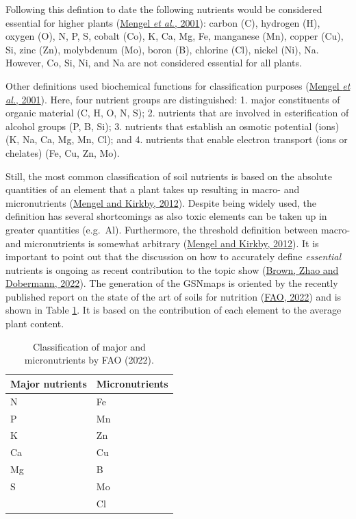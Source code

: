 \documentclass[
  10pt,
  b5paper,
  oneside]{book}
\begin{document}
Following this defintion to date the following nutrients would be considered essential for higher plants (\protect\hyperlink{ref-mengel2001}{Mengel \emph{et al.}, 2001}): carbon (C), hydrogen (H), oxygen (O), N, P, S, cobalt (Co), K, Ca, Mg, Fe, manganese (Mn), copper (Cu), Si, zinc (Zn), molybdenum (Mo), boron (B), chlorine (Cl), nickel (Ni), Na. However, Co, Si, Ni, and Na are not considered essential for all plants.

Other definitions used biochemical functions for classification purposes (\protect\hyperlink{ref-mengel2001}{Mengel \emph{et al.}, 2001}). Here, four nutrient groups are distinguished:
1. major constituents of organic material (C, H, O, N, S);
2. nutrients that are involved in esterification of alcohol groups (P, B, Si);
3. nutrients that establish an osmotic potential (ions) (K, Na, Ca, Mg, Mn, Cl); and
4. nutrients that enable electron transport (ions or chelates) (Fe, Cu, Zn, Mo).

Still, the most common classification of soil nutrients is based on the absolute quantities of an element that a plant takes up resulting in macro- and micronutrients (\protect\hyperlink{ref-mengel2012}{Mengel and Kirkby, 2012}). Despite being widely used, the definition has several shortcomings as also toxic elements can be taken up in greater quantities (e.g.~Al). Furthermore, the threshold definition between macro- and micronutrients is somewhat arbitrary (\protect\hyperlink{ref-mengel2012}{Mengel and Kirkby, 2012}).
It is important to point out that the discussion on how to accurately define \emph{essential} nutrients is ongoing as recent contribution to the topic show (\protect\hyperlink{ref-brown2022}{Brown, Zhao and Dobermann, 2022}). The generation of the GSNmaps is oriented by the recently published report on the state of the art of soils for nutrition (\protect\hyperlink{ref-symposium2022}{FAO, 2022}) and is shown in Table \ref{tab:nutrients}. It is based on the contribution of each element to the average plant content.

\begin{table}

\caption{\label{tab:nutrients}Classification of major and micronutrients by FAO (2022).}
\centering
\begin{tabular}[t]{ll}
\toprule
Major nutrients & Micronutrients\\
\midrule
N & Fe\\
P & Mn\\
K & Zn\\
Ca & Cu\\
Mg & B\\
\addlinespace
S & Mo\\
 & Cl\\
\bottomrule
\end{tabular}
\end{table}
\end{document}
